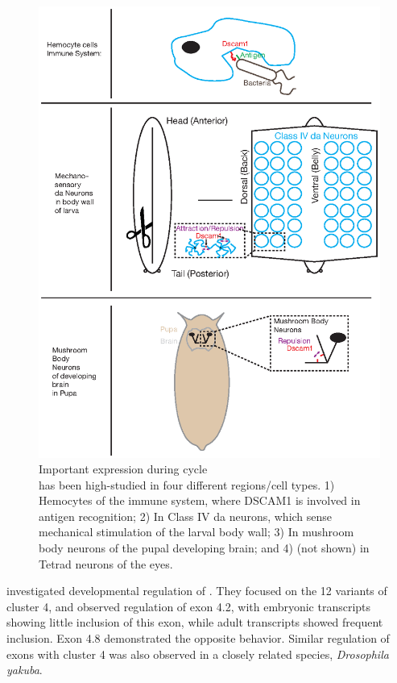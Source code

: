     \begin{figure}[htbp] %
      \centering 
      \includegraphics{Figures/Chapter1/DscamAnatomy.eps}
      \caption[Important \dscam{} expression during \flies{} life cycle]
      {
        Important \dscam{} expression during \flies{} cycle\\[0.25cm]
        \dscam{} has been high-studied in four different regions/cell types. 1) Hemocytes of the immune system, where DSCAM1 is involved in antigen recognition; 2) In Class IV da neurons, which sense mechanical stimulation of the larval body wall; 3) In mushroom body neurons of the pupal developing brain; and 4) (not shown) in Tetrad neurons of the eyes.
        }
      \label{fig:DscamAnatomy}
      \end{figure}

    \citet{Celotto2001} investigated developmental regulation of \dscam{}. They focused on the 12 variants of cluster 4, and observed regulation of exon 4.2, with embryonic transcripts showing little inclusion of this exon, while adult transcripts showed frequent inclusion. Exon 4.8 demonstrated the opposite behavior. Similar regulation of exons with cluster 4 was also observed in a closely related species, \textit{Drosophila yakuba}. 

